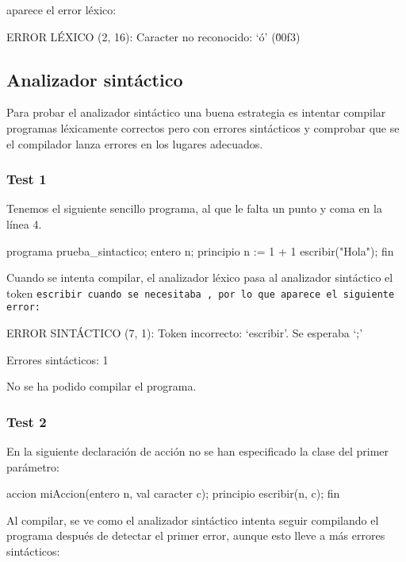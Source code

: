 aparece el error léxico:

\begin{codigo}
ERROR LÉXICO (2, 16): Caracter no reconocido: `ó' (\u00f3)
\end{codigo}

\subsection{Analizador sintáctico}
Para probar el analizador sintáctico una buena estrategia es intentar compilar programas léxicamente correctos pero con errores sintácticos y comprobar que se el compilador lanza errores en los lugares adecuados.

\subsubsection{Test 1}
Tenemos el siguiente sencillo programa, al que le falta un punto y coma en la línea 4.

\begin{codigo}[style=minileng,numbers=left]
programa prueba_sintactico;
entero n;
principio
    n := 1 + 1
    escribir("Hola");
fin
\end{codigo}

Cuando se intenta compilar, el analizador léxico pasa al analizador sintáctico el token \tt{escribir} cuando se necesitaba \car{;}, por lo que aparece el siguiente error:

\begin{codigo}
ERROR SINTÁCTICO (7, 1): Token incorrecto: `escribir'. Se esperaba `;'

Errores sintácticos: 1

No se ha podido compilar el programa.
\end{codigo}

\subsubsection{Test 2}
En la siguiente declaración de acción no se han especificado la clase del primer parámetro:

\begin{codigo}[style=minileng,numbers=left,firstnumber=4]
accion miAccion(entero n, val caracter c);
principio
    escribir(n, c);
fin
\end{codigo}

Al compilar, se ve como el analizador sintáctico intenta seguir compilando el programa después de detectar el primer error, aunque esto lleve a más errores sintácticos:

